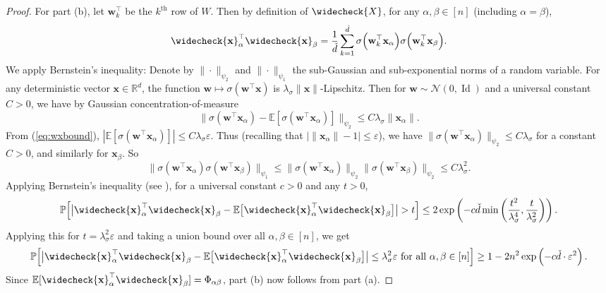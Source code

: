 \documentclass{article}
\theoremstyle{definition}
\newcommand{\R}{\mathbb{R}}
\newcommand{\N}{\mathcal{N}}
\newcommand{\E}{\mathbb{E}}
\newcommand{\Id}{\operatorname{Id}}
\newcommand{\x}{\mathbf{x}}
\newcommand{\w}{\mathbf{w}}
\renewcommand{\a}{\alpha}
\renewcommand{\b}{\beta}
\newcommand{\eps}{\varepsilon}
\newcommand{\vd}{\check{d}}
\newcommand{\vX}{\widecheck{X}}
\renewcommand{\P}{\mathbb{P}}
\newcommand{\vx}{\widecheck{\mathbf{x}}}
\newcommand{\1}{\mathbf{1}}
\begin{document}
\begin{proof}
For part (b), let $\w_k^\top$ be the $k^\text{th}$ row of $W$.
Then by definition of $\vX$, for any $\a,\b \in [n]$ (including $\a=\b$),
\[\vx_\a^\top \vx_\b=\frac{1}{\vd} \sum_{k=1}^{\vd}
\sigma\Big(\w_k^\top \x_\a\Big)
\sigma\Big(\w_k^\top \x_\b\Big).\]
We apply Bernstein's inequality: Denote by $\|\cdot\|_{\psi_2}$ and $\|\cdot\|_{\psi_1}$ the sub-Gaussian and sub-exponential norms of a random variable. For any deterministic vector $\x\in \R^{d}$, the function
$\w \mapsto \sigma(\w^\top \x)$ is
$\lambda_\sigma \|\x\|$-Lipschitz. Then for $\w \sim \N(0,\Id)$ and a universal
constant $C>0$, we have by Gaussian concentration-of-measure
\[\|\sigma(\w^\top \x_\a)-\E[\sigma(\w^\top \x_\a)]\|_{\psi_2}
\leq C\lambda_\sigma \|\x_\a\|.\]
From (\ref{eq:wxbound}),
$|\E[\sigma(\w^\top \x_\a)]| \leq C\lambda_\sigma \eps$. Thus
(recalling that $|\|\x_\a\|-1| \leq \eps$), we have
$\|\sigma(\w^\top \x_\a)\|_{\psi_2} \leq C\lambda_\sigma$ for a
constant $C>0$, and similarly for $\x_\b$. So
\begin{equation}\label{eq:subexpbound}
\|\sigma(\w^\top \x_\a) \sigma(\w^\top \x_\b)\|_{\psi_1}
\leq \|\sigma(\w^\top \x_\a)\|_{\psi_2}
\|\sigma(\w^\top \x_\b)\|_{\psi_2} \leq C\lambda_\sigma^2.
\end{equation}
Applying Bernstein's inequality (see \cite[Theorem 2.8.1]{vershynin2018high}),
for a universal constant $c>0$ and any $t>0$,
\[\P\Big[\big|\vx_\a^\top \vx_\b
-\E\big[\vx_\a^\top \vx_\b\big] \big|>t  \Big]\leq 2\exp\left(-c\vd
\min\left(\frac{t^2}{\lambda_\sigma^4},\frac{t}{\lambda_\sigma^2}\right)\right).\]
Applying this for $t=\lambda_\sigma^2\eps$ and
taking a union bound over all $\a,\b \in [n]$, we get
\begin{align}
\P\Big[\big|\vx_\a^\top \vx_\b-\E\big[\vx_\a^\top \vx_\b\big] \big|\leq
\lambda_\sigma^2 \eps
\text{ for all } \a,\b \in [n] \Big] \geq 1-2n^2\exp\left(-c\vd \cdot \eps^2\right).
\end{align}
Since $\E[\vx_\a^\top \vx_\b]=\Phi_{\a\b}$, part (b) now follows from part (a).
\end{proof}
\end{document}

